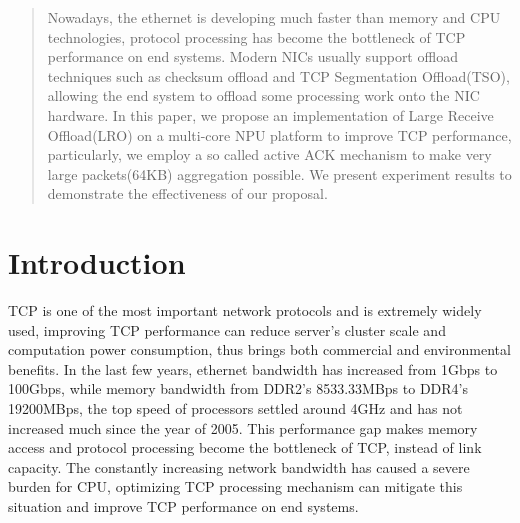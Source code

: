 \documentclass[conference]{IEEEtran}
\begin{document}




\maketitle

\begin{abstract}
Nowadays, the ethernet is developing much faster than memory and CPU technologies, protocol processing has become the bottleneck of TCP performance on end systems. Modern NICs usually support offload techniques such as checksum offload and TCP Segmentation Offload(TSO), allowing the end system to offload some processing work onto the NIC hardware. In this paper, we propose an implementation of Large Receive Offload(LRO) on a multi-core NPU platform to improve TCP performance, particularly, we employ a so called active ACK mechanism to make very large packets(64KB) aggregation possible. We present experiment results to demonstrate the effectiveness of our proposal.
\end{abstract}





%
\IEEEpeerreviewmaketitle



\section{Introduction}


TCP is one of the most important network protocols and is extremely widely used, improving TCP performance can reduce server's cluster scale and computation power consumption, thus brings both commercial and environmental benefits. In the last few years, ethernet bandwidth has increased from 1Gbps to 100Gbps, while memory bandwidth from DDR2's 8533.33MBps\cite{wikiddr2} to DDR4's 19200MBps\cite{wikiddr4}, the top speed of processors settled around 4GHz and has not increased much since the year of 2005\cite{danowitz2012cpu}. This performance gap makes memory access and protocol processing become the bottleneck of TCP, instead of link capacity. The constantly increasing network bandwidth has caused a severe burden for CPU, optimizing TCP processing mechanism can mitigate this situation and improve TCP performance on end systems.
\end{document}
